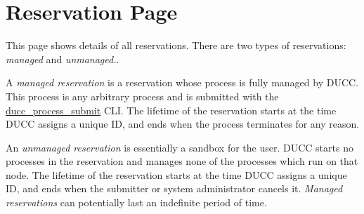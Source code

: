 
\section{Reservation Page}
\label{sec:ws-reservations}

This page shows details of all reservations.  There are two types of reservations: {\em managed}
and {\em unmanaged.}.

A {\em managed reservation} is a reservation whose process is fully managed by DUCC.  This process
is any arbitrary process and is submitted with the
\hyperref[sec:cli.ducc-process-submit]{ducc\_process\_submit} CLI.  The lifetime of the reservation
starts at the time DUCC assigns a unique ID, and ends when the process terminates for any reason.

An {\em unmanaged reservation} is essentially a sandbox for the user.  DUCC starts no processes
in the reservation and manages none of the processes which run on that node.  The lifetime of the
reservation starts at the time DUCC assigns a unique ID, and ends when the submitter or system
administrator cancels it.  {\em Managed reservations} can potentially last an indefinite
period of time.

